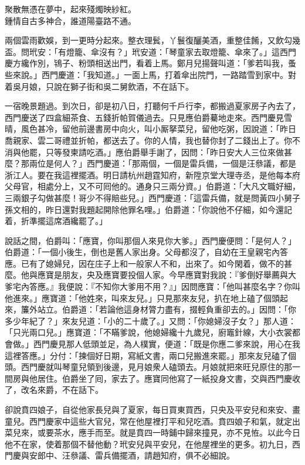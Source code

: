 \begin{myquote} 
聚散無憑在夢中，起來殘燭映紗紅。\\鍾情自古多神合，誰道陽臺路不通。
\end{myquote} 

兩個雲雨歡娛，到一更時分起來。整衣理鬂，丫鬟復釃美酒，重整佳餚，又飲勾幾盃。問玳安：「有燈籠、傘沒有？」玳安道：「琴童家去取燈籠、傘來了。」這西門慶方纔作別，鴇子、粉頭相送出門，看着上馬。鄭月兒揚聲叫道：「爹若叫我，蚤些來說。」西門慶道：「我知道。」一面上馬，打着傘出院門，一路踏雪到家中。對着吳月娘，只說在獅子街和吳二舅飲酒，不在話下。

一宿晚景題過。到次日，卻是初八日，打聽何千戶行李，都搬過夏家房子內去了，西門慶送了四盒細茶食、五錢折帕賀儀過去。只見應伯爵驀地走來。西門慶見雪晴，風色甚冷，留他前邊書房中向火，叫小厮拏菜兒，留他吃粥，因說道：「昨日喬親家、雲二哥禮並折帕，都送去了。你的人情，我也替你封了二錢出上了。你不消與他罷，只等發柬請吃酒。」應伯爵舉手謝了，因問：「昨日安大人三位來做甚麼？那兩位是何人？」西門慶道：「那兩個，一個是雷兵備，一個是汪叅議，都是浙江人。要在我這裡擺酒。明日請杭州趙霆知府，新陞京堂大理寺丞，是他每本府父母官，相處分上，又不可囘他的。通身只三兩分資。」伯爵道：「大凡文職好細，三兩銀子勾做甚麼！哥少不得賠些兒。」西門慶道：「這雷兵備，就是問黃四小舅子孫文相的，昨日還對我題起開除他罪名哩。」伯爵道：「你說他不仔細，如今還記着，折準擺這席酒纔罷了。」{}

說話之間，伯爵叫：「應寶，你叫那個人來見你大爹。」西門慶便問：「是何人？」伯爵道：「一個小後生，倒也是舊人家出身。父母都沒了，自幼在王皇親宅內答應。已有了媳婦兒，因在庄子上和一般家人不和，出來了。如今閑着，做不的甚麼。他與應寶是朋友，央及應寶要投個人家。今早應寶對我說：『爹倒好舉薦與大爹宅內答應。』我便說：『不知你大爹用不用？』」因問應寶：「他叫甚麼名字？你叫他進來。」應寶道：「他姓來，叫來友兒。」只見那來友兒，扒在地上磕了個頭起來，簾外站立。伯爵道：「若論他這身材膂力盡有，掇輕負重卻去的。」因問：「你多少年紀了？」來友兒道：「小的二十歲了。」又問：「你媳婦沒子女？」那人道：「只光兩口兒。」應寶道：「不瞞爹說，他媳婦纔十九歲兒，廚竈針線，大小衣裳都會做。」西門慶見那人低頭並足，為人樸實，便道：「既是你應二爹來說，用心在我這裡答應。」分付：「揀個好日期，寫紙文書，兩口兒搬進來罷。」那來友兒磕了個頭。西門慶就叫琴童兒領到後邊，見月娘衆人磕頭去。月娘就把來旺兒原住的那一間房與他居住。伯爵坐了囘，家去了。應寶同他寫了一紙投身文書，交與西門慶收了，改名來爵，不在話下。

卻說賁四娘子，自從他家長兒與了夏家，每日買東買西，只央及平安兒和來安、畫童兒。西門慶家中這些大官兒，常在他屋裡打平和兒吃酒。賁四娘子和氣，就定出菜兒來，或要茶水，應手而至。就是賁四一時鋪中歸來撞見，亦不見恠。以此今日他不在家，使着那個不替他動？玳安兒與平安兒，在他屋裡坐的更多。初九日，西門慶與安郎中、汪叅議、雷兵備擺酒，請趙知府，俱不必細說。


